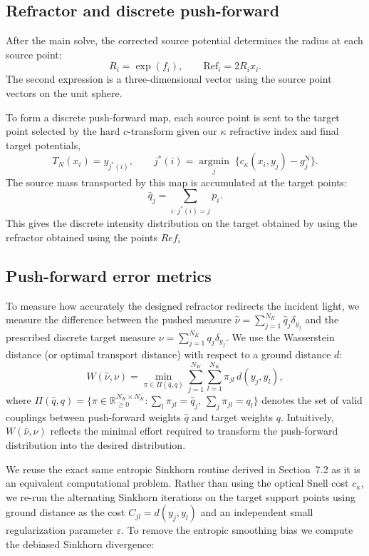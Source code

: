 \documentclass{article}
\begin{document}
\subsection{Refractor and discrete push-forward}

After the main solve, the corrected source potential determines the radius at
each source point:
\[
    R_i=\exp(f_i),
    \qquad
    \mathrm{Ref}_i=2R_i x_i.
\]
The second expression is a three-dimensional vector using the source point vectors on the unit sphere.

To form a discrete push-forward map, each source point is sent to the target
point selected by the hard $c$-transform given our $\kappa$ refractive index and final target potentials,
\[
    T_N(x_i)=y_{j^*(i)},
    \qquad
    j^*(i)=\underset{j}{\operatorname{argmin}}\;
    \{c_\kappa(x_i,y_j)-g^{\mathrm{N}}_j\}.
\]
The source mass transported by this map is accumulated at the target points:
\[
    \widehat q_j=\sum_{i:\,j^*(i)=j}p_i.
\]
This gives the discrete intensity distribution on the target obtained by using the refractor obtained using the points $Ref_i$

\subsection{Push-forward error metrics}

To measure how accurately the designed refractor redirects the incident light, we measure the difference between the pushed measure $\widehat{\nu} = \sum_{j=1}^{N_K} \widehat{q}_j \delta_{y_j}$ and the prescribed discrete target measure $\nu = \sum_{j=1}^{N_K} q_j \delta_{y_j}$. We use the Wasserstein distance (or optimal transport distance) with respect to a ground distance $d$:
\[
    W(\widehat{\nu}, \nu) = \min_{\pi \in \Pi(\widehat{q}, q)} \sum_{j=1}^{N_K} \sum_{l=1}^{N_K} \pi_{jl} \, d(y_j, y_l),
\]
where $\Pi(\widehat{q}, q) = \{ \pi \in \mathbb{R}_{\ge 0}^{N_K \times N_K} : \sum_l \pi_{jl} = \widehat{q}_j, \, \sum_j \pi_{jl} = q_l \}$ denotes the set of valid couplings between push-forward weights $\widehat{q}$ and target weights $q$. Intuitively, $W(\widehat{\nu}, \nu)$ reflects the minimal effort required to transform the push-forward distribution into the desired distribution.

We reuse the exact same entropic Sinkhorn routine derived in Section~7.2 as it is an equivalent computational problem. Rather than using the optical Snell cost $c_\kappa$, we re-run the alternating Sinkhorn iterations on the target support points using ground distance as the cost $C_{jl} = d(y_j, y_l)$ and an independent small regularization parameter $\varepsilon$. To remove the entropic smoothing bias we compute the debiased Sinkhorn divergence:
\end{document}
